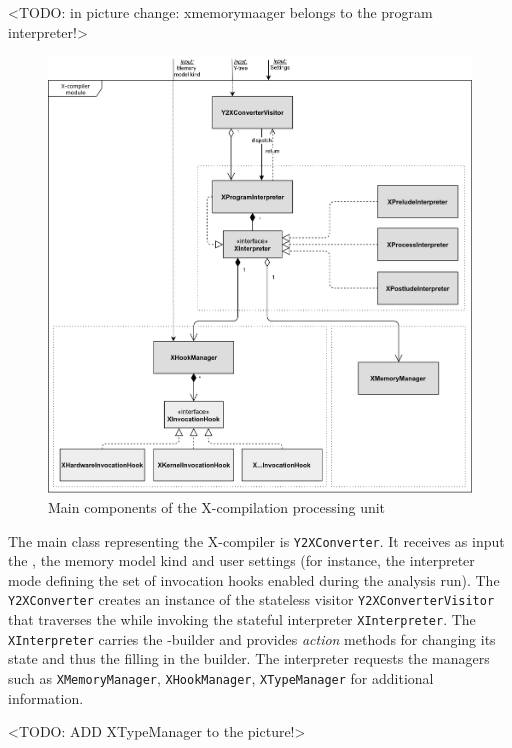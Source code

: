 <TODO: in picture change: xmemorymaager belongs to the program interpreter!>

\begin{figure}[!t]%
    \centering
  \includegraphics[max width=\textwidth,keepaspectratio]{img/my/draw.io/X-compiler.png}
  \caption{Main components of the X-compilation processing unit}
  \label{fig:compiler}
\end{figure}

The main class representing the X-compiler is \texttt{Y2XConverter}. %
It receives as input the \ytree{}, the memory model kind and user settings (for instance, the interpreter mode defining the set of invocation hooks enabled during the analysis run).
The \texttt{Y2XConverter} creates an instance of the stateless visitor \texttt{Y2XConverterVisitor} that traverses the \ytree{} while invoking the stateful interpreter \texttt{XInterpreter}.
The \texttt{XInterpreter} carries the \xgraph{}-builder and provides \textit{action} methods for changing its state and thus the filling in the builder.
The interpreter requests the managers such as \texttt{XMemoryManager}, \texttt{XHookManager}, \texttt{XTypeManager} for additional information. 

<TODO: ADD XTypeManager to the picture!>

